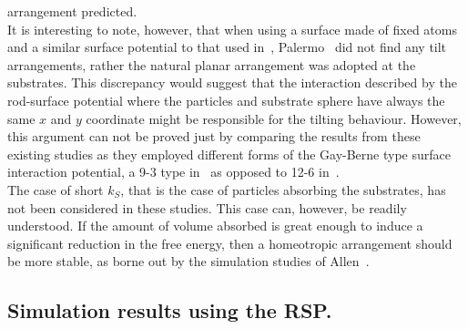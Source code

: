 arrangement predicted.\\
It is interesting to note, however, that when using a surface made of fixed atoms
and a similar surface potential to that used in~\cite{WallCleaver97},  
Palermo~\etal\cite{PalermoBiscarini98} 
did not find any tilt arrangements, rather the natural planar arrangement was adopted at 
the substrates. This discrepancy would suggest that the interaction described by the rod-surface
potential where the particles and substrate sphere have always the same $x$ and $y$ coordinate
might be responsible for the tilting behaviour. However, this argument can not be proved just by
comparing the results from these existing studies as they employed different forms of the 
Gay-Berne type surface interaction potential, a 9-3 type in~\cite{WallCleaver97} as opposed to 12-6
in~\cite{PalermoBiscarini98}.\\


The case of short $k_S$, that is the case of particles absorbing the substrates, 
has not been considered in these studies. This case can, however,  be readily
understood. If the amount of volume absorbed is great enough to induce a significant 
reduction in the free energy, then a homeotropic arrangement should be more stable, as borne out
by the simulation studies of Allen~\cite{Allen99}.

\subsection{Simulation results using the RSP.}
\label{ss:RSPresults}


